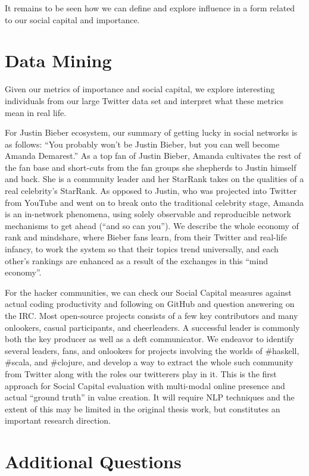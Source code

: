 It remains to be seen how we can define and explore influence in a form related to our social capital and importance.

\section{Data Mining}

	Given our metrics of importance and social capital, we explore interesting individuals from our large Twitter data set and interpret what these metrics mean in real life. 
	
	For Justin Bieber ecosystem, our summary of getting lucky in social networks is as follows: ``You probably won’t be Justin Bieber, but you can well become Amanda Demarest.''  As a top fan of Justin Bieber, Amanda cultivates the rest of the fan base and short-cuts from the fan groups she shepherds to Justin himself and back.  She is a community leader and her StarRank takes on the qualities of a real celebrity’s StarRank.  As opposed to Justin, who was projected into Twitter from YouTube and went on to break onto the traditional celebrity stage, Amanda is an in-network phenomena, using solely observable and reproducible network mechanisms to get ahead (``and so can you'').  We describe the whole economy of rank and mindshare, where Bieber fans learn, from their Twitter and real-life infancy, to work the system so that their topics trend universally, and each other’s rankings are enhanced as a result of the exchanges in this “mind economy”.
	
	For the hacker communities, we can check our Social Capital measures against actual coding productivity and following on GitHub and question answering on the IRC.  Most open-source projects consists of a few key contributors and many onlookers, casual participants, and cheerleaders.  A successful leader is commonly both the key producer as well as a deft communicator.  We endeavor to identify several leaders, fans, and onlookers for projects involving the worlds of \#haskell, \#scala, and \#clojure, and develop a way to extract the whole such community from Twitter along with the roles our twitterers play in it.  This is the first approach for Social Capital evaluation with multi-modal online presence and actual “ground truth” in value creation.  It will require NLP techniques and the extent of this may be limited in the original thesis work, but constitutes an important research direction.

\section{Additional Questions}

